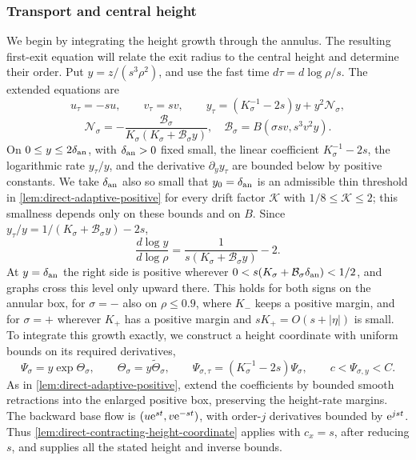 \subsubsection{Transport and central height}

We begin by integrating the height growth through the annulus. The
resulting first-exit equation will relate the exit radius to the central
height and determine their order.
Put \(y=z/(s^3\rho^2)\), and use the fast time
\(d\tau=d\log\rho/s\). The extended equations are
\[
 u_\tau=-su,\qquad v_\tau=sv,\qquad
 y_\tau=(K_\sigma^{-1}-2s)y+y^2\mathcal N_\sigma,
\]
\[
 \mathcal N_\sigma=-\frac{\mathcal B_\sigma}
                  {K_\sigma(K_\sigma+\mathcal B_\sigma y)},
 \quad
 \mathcal B_\sigma=B(\sigma sv,s^3v^2y).
\]
On \(0\le y\le2\delta_{\rm an}\), with \(\delta_{\rm an}>0\) fixed small,
the linear coefficient \(K_\sigma^{-1}-2s\), the logarithmic rate
\(y_\tau/y\), and the derivative \(\partial_y y_\tau\) are bounded
below by positive constants.
We take \(\delta_{\rm an}\) also so small that \(y_0=\delta_{\rm an}\) is an
admissible thin threshold in \cref{lem:direct-adaptive-positive} for every
drift factor \(\mathcal K\) with \(1/8\le\mathcal K\le2\); this smallness
depends only on these bounds and on \(B\).
Since \(y_\tau/y=1/(K_\sigma+\mathcal B_\sigma y)-2s\),
\begin{equation}
\label{eq:direct-annulus-level-crossing}
 \frac{d\log y}{d\log\rho}
   =\frac1{s(K_\sigma+\mathcal B_\sigma y)}-2 .
\end{equation}
At \(y=\delta_{\rm an}\) the right side is positive wherever
\(0<s(K_\sigma+\mathcal B_\sigma\delta_{\rm an})<1/2\), and graphs cross
this level only upward there. This holds for both signs on the annular
box, for \(\sigma=-\) also on \(\rho\le0.9\), where \(K_-\) keeps a positive margin,
and for \(\sigma=+\) wherever \(K_+\) has a positive margin and
\(sK_+=O(s+|\eta|)\) is small.
To integrate this growth exactly, we construct a height coordinate with
uniform bounds on its required derivatives,
\[
 \Psi_\sigma=y\exp\Theta_\sigma,\qquad
 \Theta_\sigma=y\widetilde\Theta_\sigma,\qquad
 \Psi_{\sigma,\tau}=(K_\sigma^{-1}-2s)\Psi_\sigma,
 \qquad c<\Psi_{\sigma,y}<C .
\]
As in \cref{lem:direct-adaptive-positive}, extend the coefficients
by bounded smooth retractions into the enlarged positive box, preserving
the height-rate margins. The backward base flow is
\((u\mathrm e^{st},v\mathrm e^{-st})\), with order-\(j\) derivatives bounded by
\(\mathrm e^{jst}\). Thus \cref{lem:direct-contracting-height-coordinate}
applies with \(c_x=s\), after reducing \(s\), and supplies all the
stated height and inverse bounds.

